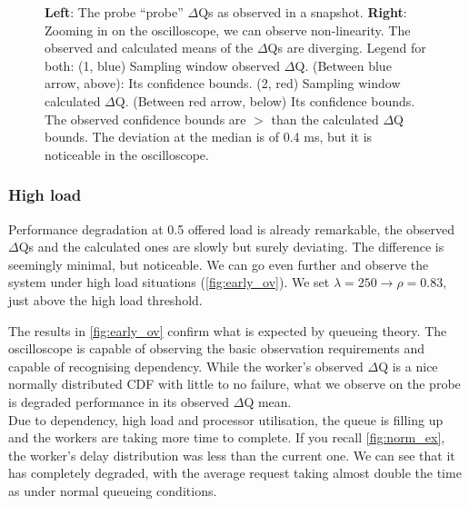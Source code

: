 \begin{figure}[H]
            \caption{\textbf{Left}: The probe ``probe'' $\Delta$Qs as observed in a snapshot. \textbf{Right}: Zooming in on the oscilloscope, we can observe non-linearity. The observed and calculated means of the $\Delta$Qs are diverging. Legend for both: (1, blue) Sampling window observed $\Delta$Q. (Between blue arrow, above): Its confidence bounds. (2, red) Sampling window calculated $\Delta$Q. (Between red arrow, below) Its confidence bounds. \\ The observed confidence bounds are $>$ than the calculated $\Delta$Q bounds. The deviation at the median is of 0.4 ms, but it is noticeable in the oscilloscope.}
            \label{fig:avavv} 
        \end{figure}
       
\subsubsection{High load}
    Performance degradation at 0.5 offered load is already remarkable, the observed $\Delta$Qs and the calculated ones are slowly but surely deviating. The difference is seemingly minimal, but noticeable. We can go even further and observe the system under high load situations (\cref{fig:early_ov}). We set $\lambda = 250 \rightarrow \rho = 0.83$, just above the high load threshold.
    
    The results in \cref{fig:early_ov} confirm what is expected by queueing theory. The oscilloscope is capable of observing the basic observation requirements and capable of recognising dependency. While the worker's observed $\Delta$Q is a nice normally distributed CDF with little to no failure, what we observe on the probe is degraded performance in its observed $\Delta$Q mean. \\
    Due to dependency, high load and processor utilisation, the queue is filling up and the workers are taking more time to complete. If you recall \cref{fig:norm_ex}, the worker's delay distribution was less than the current one. We can see that it has completely degraded, with the average request taking almost double the time as under normal queueing conditions. 

